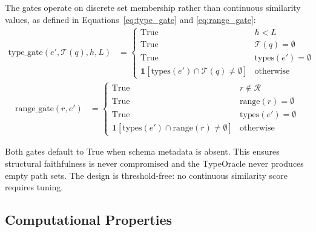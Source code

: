 The gates operate on discrete set membership rather than continuous similarity values, as defined in Equations~\eqref{eq:type_gate} and \eqref{eq:range_gate}:
\begin{align}
  \text{type\_gate}(e', \mathcal{T}(q), h, L) & = \begin{cases}
                                                    \text{True}                                                     & h < L                        \\
                                                    \text{True}                                                     & \mathcal{T}(q) = \emptyset   \\
                                                    \text{True}                                                     & \text{types}(e') = \emptyset \\
                                                    \mathbf{1}[\text{types}(e') \cap \mathcal{T}(q) \neq \emptyset] & \text{otherwise}
                                                  \end{cases}
  \label{eq:type_gate}
\end{align}
\begin{align}
  \text{range\_gate}(r, e') & = \begin{cases}
                                  \text{True}                                                      & r \notin \mathcal{R}         \\
                                  \text{True}                                                      & \text{range}(r) = \emptyset  \\
                                  \text{True}                                                      & \text{types}(e') = \emptyset \\
                                  \mathbf{1}[\text{types}(e') \cap \text{range}(r) \neq \emptyset] & \text{otherwise}
                                \end{cases}
  \label{eq:range_gate}
\end{align}

Both gates default to True when schema metadata is absent. This ensures structural faithfulness is never compromised and the TypeOracle never produces empty path sets. The design is threshold-free: no continuous similarity score requires tuning.

\subsection{Computational Properties}

